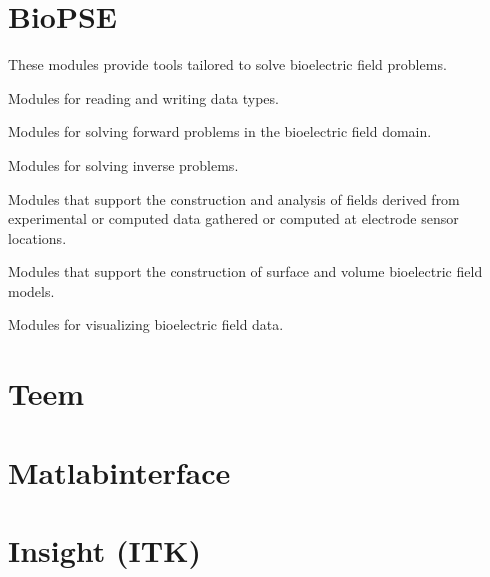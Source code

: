 \section{BioPSE}
\label{sec:biopsepackage}


These modules provide  tools tailored to solve bioelectric field
problems.

\begin{description}
   Modules for reading and writing \sr{}
  data types.
  
   Modules for solving forward
  problems in the bioelectric field domain.
  
   Modules for solving inverse
  problems.
  
   Modules that support
  the construction and analysis of fields derived from experimental or
  computed data gathered or computed at electrode sensor locations.
  
   Modules that support the
  construction of surface and volume bioelectric field models.
  
   Modules for visualizing
  bioelectric field data.
\end{description}


\section{Teem}
\label{sec:teempackage}

\begin{description}




\end{description}

\section{Matlabinterface}
\label{sec:matlabpackage}

\begin{description}


\end{description}

\section{Insight (ITK)}
\label{sec:insightpackage}

\begin{description}
  
  
\end{description}

